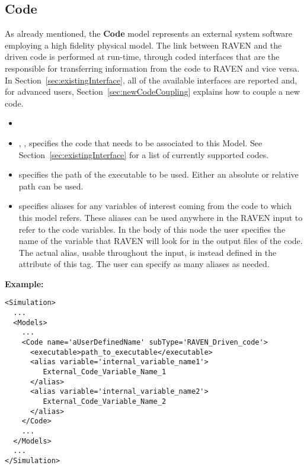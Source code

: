 \subsection{Code}
\label{subsec:models_code}
As already mentioned, the \textbf{Code} model represents an external system
software employing a high fidelity physical model.
%
The link between RAVEN and the driven code is performed at run-time, through
coded interfaces that are the responsible for transferring information from the
code to RAVEN and vice versa.
%
In Section~\ref{sec:existingInterface}, all of the available interfaces are
reported and, for advanced users, Section~\ref{sec:newCodeCoupling} explains how
to couple a new code.


%
\attrsIntro
%
\vspace{-5mm}
\begin{itemize}
  \itemsep0em
  \item \nameDescription
  \item {}, , specifies the
  code that needs to be associated to this Model.
  \nb See Section~\ref{sec:existingInterface} for a list of currently supported
  codes.
\end{itemize}
\vspace{-5mm}

\subnodesIntro
%
\begin{itemize}
  \item {}  specifies the path
  of the executable to be used.
  \nb Either an absolute or relative path can be used.
  \item {}  specifies aliases for
  any variables of interest coming from the code to which this model refers.
  These aliases can be used anywhere in the RAVEN input to refer to the code
  variables.
  In the body of this node the user specifies the name of the variable that
  RAVEN will look for in the output files of the code.
  The actual alias, usable throughout the input, is instead defined in the
   attribute of this tag.
  \nb The user can specify as many aliases as needed.
\end{itemize}
\textbf{Example:}
\begin{lstlisting}[style=XML,morekeywords={subType,name,variable}]
<Simulation>
  ...
  <Models>
    ...
    <Code name='aUserDefinedName' subType='RAVEN_Driven_code'>
      <executable>path_to_executable</executable>
      <alias variable='internal_variable_name1'>
         External_Code_Variable_Name_1
      </alias>
      <alias variable='internal_variable_name2'>
         External_Code_Variable_Name_2
      </alias>
    </Code>
    ...
  </Models>
  ...
</Simulation>
\end{lstlisting}

